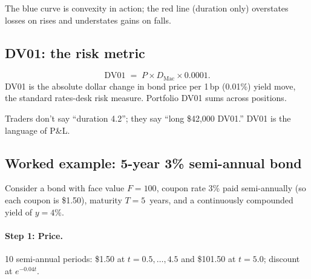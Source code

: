 The blue curve is convexity in action; the red line (duration only)
overstates losses on rises and understates gains on falls.

\subsection{DV01: the risk metric}

\begin{definition}
\begin{equation}
  \text{DV01} \;=\; P \times D_{\text{Mac}} \times 0.0001.
  \label{eq:dv01}
\end{equation}
DV01 is the absolute dollar change in bond price per 1\,bp (0.01\%)
yield move, the standard rates-desk risk measure.  Portfolio DV01
sums across positions.
\end{definition}

\begin{intuitionbox}
Traders don't say ``duration 4.2''; they say ``long \$42,000 DV01.''
DV01 is the language of P\&L.
\end{intuitionbox}

\subsection{Worked example: 5-year 3\% semi-annual bond}
\label{sec:fi_bond_worked}

Consider a bond with face value $F = 100$, coupon rate 3\% paid
semi-annually (so each coupon is \$1.50), maturity $T = 5$~years,
and a continuously compounded yield of $y = 4\%$.

\paragraph{Step 1: Price.}
10 semi-annual periods: \$1.50 at $t = 0.5, \ldots, 4.5$ and \$101.50
at $t = 5.0$; discount at $e^{-0.04t}$.

